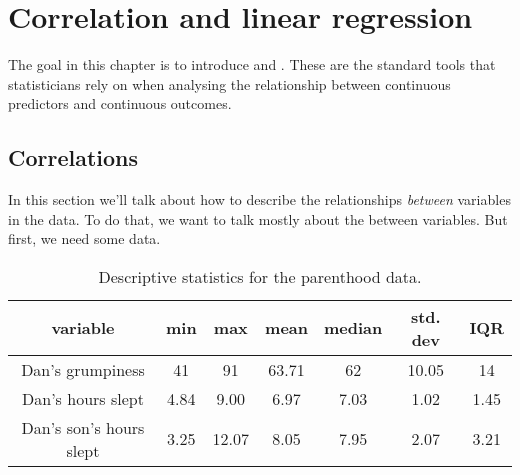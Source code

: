 
\chapter{Correlation and linear regression\label{ch:regression}}


The goal in this chapter is to introduce  and . These are the standard tools that statisticians rely on when analysing the relationship between continuous predictors and continuous outcomes. 


\section{Correlations\label{sec:correl}}

In this section we'll talk about how to describe the relationships {\it between} variables in the data. To do that, we want to talk mostly about the  between variables. But first, we need some data.


\begin{table}[ht]
\caption{Descriptive statistics for the parenthood data.} \tabcapsep
\label{tab:parenthood}
\begin{center}
\begin{tabular}{c|cccccc}  
variable & min & max & mean & median & std. dev & IQR \\ \hline
Dan's grumpiness & 41 & 91 & 63.71 & 62 & 10.05 & 14 \\
Dan's hours slept & 4.84 & 9.00 & 6.97 & 7.03 & 1.02 & 1.45  \\
Dan's son's hours slept & 3.25 & 12.07 & 8.05 & 7.95 & 2.07 & 3.21 \\ 
\end{tabular}
\tabcapsep
\HR
\end{center}
\end{table}


